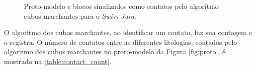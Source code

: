 \begin{figure}[H]
    \caption{Proto-modelo e blocos sinalizados como contatos pelo algoritmo cubos marchantes para o \textit{Swiss Jura}.} \label{fig:jura_proto}
     \centering
     \hspace{1em}
\end{figure}

O algoritmo dos cubos marchantes, ao identificar um contato, faz sua contagem e o registra. O número de contatos entre as diferentes litologias, contados pelo algoritmo dos cubos marchantes no proto-modelo da Figura \autoref{fig:proto}, é mostrado na \autoref{table:contact_count}.

